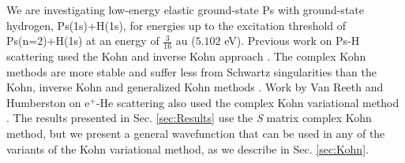 \documentclass[reprint,showpacs,preprintnumbers,amsmath,amssymb,pra,aps]{revtex4-1}
\begin{document}
We are investigating low-energy elastic ground-state Ps with ground-state hydrogen, Ps(1s)+H(1s), for energies up to the excitation threshold of Ps(n=2)+H(1s) at an energy of $\tfrac{3}{16}$ au ($5.102$ eV). Previous work on Ps-H scattering used the Kohn and inverse Kohn approach \cite{VanReeth2003, VanReeth2004}. The complex Kohn methods are more stable and suffer less from Schwartz singularities than the Kohn, inverse Kohn and generalized Kohn methods \cite{Lucchese1989,Cooper2009,Cooper2010}. Work by Van Reeth and Humberston on e$^+$-He scattering also used the complex Kohn variational method \cite{VanReeth1999}. The results presented in Sec. \ref{sec:Results} use the \emph{S} matrix complex Kohn method, but we present a general wavefunction that can be used in any of the variants of the Kohn variational method, as we describe in Sec. \ref{sec:Kohn}.
\end{document}
